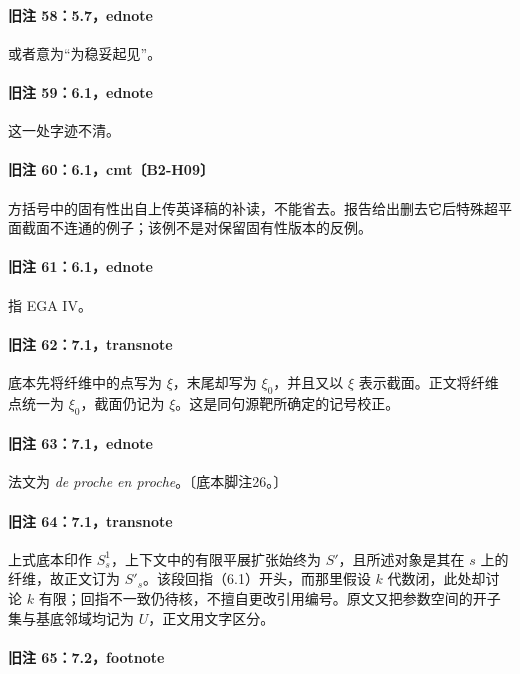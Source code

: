 \documentclass[UTF8,a4paper]{ctexbook}
\begin{document}
\paragraph{旧注 58：5.7，ednote}

或者意为“为稳妥起见”。

\paragraph{旧注 59：6.1，ednote}

这一处字迹不清。

\paragraph{旧注 60：6.1，cmt〔B2-H09〕}

方括号中的固有性出自上传英译稿的补读，不能省去。报告给出删去它后特殊超平面截面不连通的例子；该例不是对保留固有性版本的反例。

\paragraph{旧注 61：6.1，ednote}

指 EGA IV。

\paragraph{旧注 62：7.1，transnote}

底本先将纤维中的点写为 $\xi$，末尾却写为 $\xi_0$，并且又以 $\xi$ 表示截面。正文将纤维点统一为 $\xi_0$，截面仍记为 $\xi$。这是同句源靶所确定的记号校正。

\paragraph{旧注 63：7.1，ednote}

法文为 \textit{de proche en proche}。〔底本脚注26。〕

\paragraph{旧注 64：7.1，transnote}

上式底本印作 $S_s^1$，上下文中的有限平展扩张始终为 $S'$，且所述对象是其在 $s$ 上的纤维，故正文订为 $S'_s$。该段回指（6.1）开头，而那里假设 $k$ 代数闭，此处却讨论 $k$ 有限；回指不一致仍待核，不擅自更改引用编号。原文又把参数空间的开子集与基底邻域均记为 $U$，正文用文字区分。

\paragraph{旧注 65：7.2，footnote}
\end{document}
